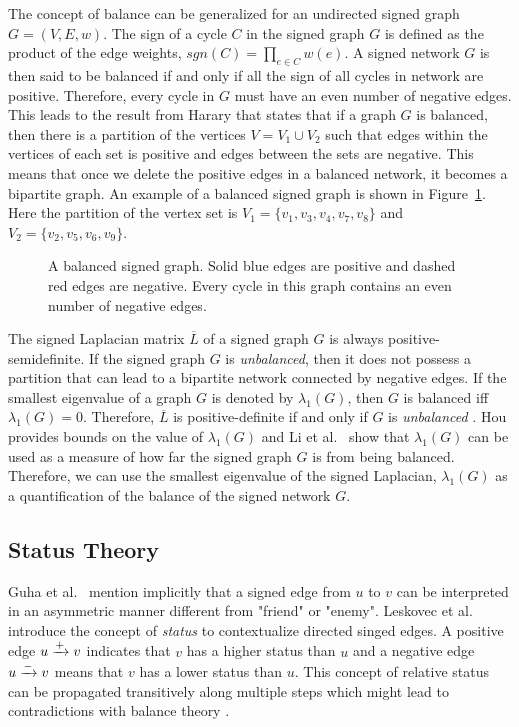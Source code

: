 The concept of balance can be generalized for an undirected signed graph $G=(V,E,w)$.
The sign of a cycle $C$ in the signed graph $G$ is defined as the product of the edge weights, $sgn(C)=\prod_{e\in C}w(e)$.
A signed network $G$ is then said to be balanced if and only if all the sign of all cycles in network are positive.
Therefore, every cycle in $G$ must have an even number of negative edges.
This leads to the result from Harary \cite{harary1953on} that states that if a graph $G$ is balanced, then there is a partition of the vertices $V = V_1 \cup V_2$ such that edges within the vertices of each set is positive and edges between the sets are negative.
This means that once we delete the positive edges in a balanced network, it becomes a bipartite graph.
An example of a balanced signed graph is shown in Figure~\ref{fig:balanced-graph}.
Here the partition of the vertex set is $V_1 = \{v_1,v_3,v_4,v_7,v_8\}$ and $V_2 = \{v_2,v_5,v_6,v_9\}$.

\begin{figure}[!ht]
    \centering
    
    \caption{ A balanced signed graph. Solid blue edges are positive and dashed red edges are negative. Every cycle in this graph contains an even number of negative edges.}
    \label{fig:balanced-graph}
\end{figure}

The signed Laplacian matrix $\overline{L}$ of a signed graph $G$ is always positive-semidefinite.
If the signed graph $G$ is \textit{unbalanced}, then it does not possess a partition that can lead to a bipartite network connected by negative edges.
If the smallest eigenvalue of a graph $G$ is denoted by $\lambda_{1}(G)$, then $G$ is balanced iff $\lambda_{1}(G)=0$.
Therefore, $\overline{L}$ is positive-definite if and only if $G$ is \textit{unbalanced} \cite{kunegis2010spectral,hou2005bounds,zaslavsky1982signed}.
Hou \cite{hou2005bounds} provides bounds on the value of $\lambda_{1}(G)$ and Li et al.\ \cite{li2016note} show that $\lambda_{1}(G)$ can be used as a measure of how far the signed graph $G$ is from being balanced. 
Therefore, we can use the smallest eigenvalue of the signed Laplacian, $\lambda_{1}(G)$ as a quantification of the balance of the signed network $G$.

\subsection{Status Theory}
\label{sec:status-theory}
Guha et al.\ \cite{guha2004propagation} mention implicitly that a signed edge from $u$ to $v$ can be interpreted in an asymmetric manner different from "friend" or "enemy".
Leskovec et al.\ \cite{leskovec2010signed,leskovec2010predicting} introduce the concept of \textit{status} to contextualize directed singed edges.
A positive edge $u \xrightarrow{+} v$ indicates that $v$ has a higher status than $u$ and a negative edge $u \xrightarrow{-} v$ means that $v$ has a lower status than $u$.
This concept of relative status can be propagated transitively along multiple steps which might lead to contradictions with balance theory \cite{leskovec2010signed}.

